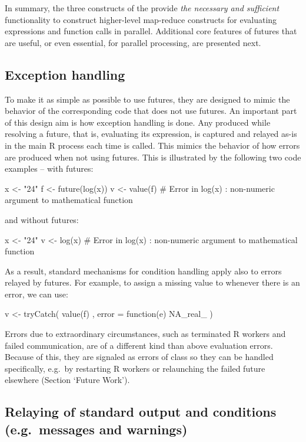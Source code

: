 In summary, the three constructs of the  provide
\emph{the necessary and sufficient} functionality to construct
higher-level map-reduce constructs for evaluating expressions and
function calls in parallel.  Additional core features of futures that
are useful, or even essential, for parallel processing, are presented
next.


\subsection{Exception handling}
\label{error-handling}

To make it as simple as possible to use futures, they are designed to
mimic the behavior of the corresponding code that does not use
futures.  An important part of this design aim is how exception
handling is done.  Any  produced while resolving a future,
that is, evaluating its expression, is captured and relayed as-is in
the main R process each time  is called.  This mimics
the behavior of how errors are produced when not using futures.  This
is illustrated by the following two code examples -- with futures:
\begin{example}
x <- "24"
f <- future(log(x))
v <- value(f)
# Error in log(x) : non-numeric argument to mathematical function
\end{example}
and without futures:
\begin{example}
x <- "24"
v <- log(x)
# Error in log(x) : non-numeric argument to mathematical function
\end{example}
As a result, standard mechanisms for condition handling apply also to
errors relayed by futures.  For example, to assign a missing value
to  whenever there is an error, we can use:
\begin{example}
v <- tryCatch({
  value(f)
}, error = function(e) {
  NA_real_
})
\end{example}

Errors due to extraordinary circumstances, such as terminated R
workers and failed communication, are of a different kind than above
evaluation errors.  Because of this, they are signaled as errors of
class  so they can be handled specifically, e.g.\ by
restarting R workers or relaunching the failed future elsewhere
(Section `Future Work').


\subsection{Relaying of standard output and conditions (e.g.\ messages and warnings)}
\label{relaying-of-standard-output-and-conditions-e.g.messages-and-warnings}

